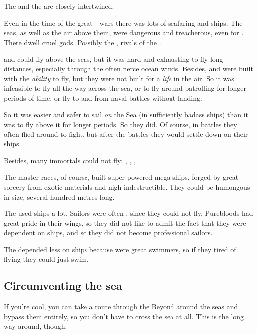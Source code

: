 The  and the  are closely intertwined.

Even in the time of the great \dragon-\resphan{} wars there was lots of seafaring and ships. 
The seas, as well as the air above them, were dangerous and treacherous, even for \dragons. 
There dwell cruel gods. 
Possibly the , rivals of the .

\Dragons{} and \resphain{} could fly above the seas, but it was hard and exhausting to fly long distances, especially through the often fierce ocean winds. 
Besides, \dragons{} and \resphain{} were built with the \emph{ability} to fly, but they were not built for a \emph{life} in the air. 
So it was infeasible to fly all the way across the sea, or to fly around patrolling for longer periods of time, or fly to and from naval battles without landing. 

So it was easier and safer to sail \emph{on} the Sea (in sufficiently badass ships) than it was to fly above it for longer periods. 
So they did. 
Of course, in battles they often flied around to fight, but after the battles they would settle down on their ships. 

Besides, many immortals could not fly: 
\QuilJaaran, \aryothim, \vorcanths, \bezedeth. 

The master races, of course, built super-powered mega-ships, forged by great sorcery from exotic materials and nigh-indestructible. They could be humongous in size, several hundred metres long. 

The \resphain used ships a lot.
Sailors were often \bezedeth, since they could not fly.
Purebloods had great pride in their wings, so they did not like to admit the fact that they were dependent on ships, and so they did not become professional sailors.

The \dragons depended less on ships because \dragons were great swimmers, so if they tired of flying they could just swim.







\subsection{Circumventing the sea}
If you're cool, you can take a route through the Beyond around the seas and bypass them entirely, so you don't have to cross the sea at all. 
This is the long way around, though. 

